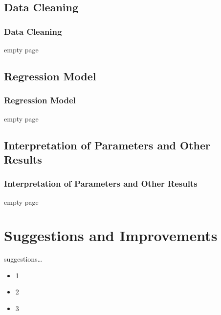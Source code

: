 \documentclass{beamer}
\begin{document}
\subsection{Data Cleaning}
\begin{frame}[fragile]
\frametitle{Data Cleaning}


empty page

\end{frame}



\subsection{Regression Model}
\begin{frame}[fragile]
\frametitle{Regression Model}


empty page

\end{frame}


\subsection{Interpretation of Parameters and Other Results}
\begin{frame}[fragile]
\frametitle{Interpretation of Parameters and Other Results}

empty page

\end{frame}


\section{Suggestions and Improvements}
\begin{frame}{suggestions\dots{}}

\begin{itemize}
\item 1
\item 2
\item 3
\end{itemize}

\end{frame}
\end{document}
